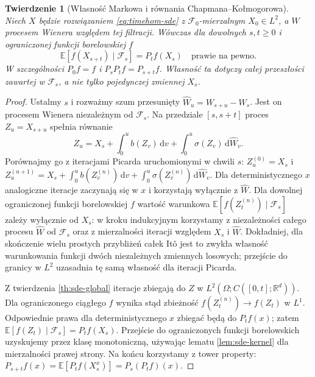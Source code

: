 \documentclass[11pt,a4paper,oneside]{report}
\numberwithin{equation}{chapter}
\theoremstyle{plain}
\newtheorem{twierdzenie}{Twierdzenie}[chapter]
\theoremstyle{definition}
\theoremstyle{remark}
\newcommand{\R}{\mathbb{R}}
\newcommand{\E}{\mathbb{E}}
\newcommand{\calF}{\mathcal{F}}
\newcommand{\dd}{\mathrm{d}}
\begin{document}
\begin{twierdzenie}[Własność Markowa i równania Chapmana--Kołmogorowa]
\label{th:sde-markov}
Niech $X$ będzie rozwiązaniem \eqref{eq:timehom-sde}
z $\calF_0$-mierzalnym $X_0\in L^2$, a $W$ procesem
Wienera względem tej filtracji. Wówczas dla dowolnych
$s,t\ge0$ i ograniczonej funkcji borelowskiej $f$
\[
\E[f(X_{s+t})\mid\calF_s]=P_tf(X_s)
\quad\text{prawie na pewno}.
\tag{6.3}\label{eq:sde-markov}
\]
W szczególności $P_0f=f$ i $P_sP_tf=P_{s+t}f$.
Własność ta dotyczy \emph{całej przeszłości} zawartej
w $\calF_s$, a nie tylko pojedynczej zmiennej $X_s$.
\end{twierdzenie}
\begin{proof}
Ustalmy $s$ i rozważmy szum przesunięty
$\widehat W_u=W_{s+u}-W_s$. Jest on procesem Wienera
niezależnym od $\calF_s$. Na przedziale $[s,s+t]$
proces $Z_u=X_{s+u}$ spełnia równanie
\[
Z_u=X_s+\int_0^u b(Z_v)\,\dd v
+\int_0^u\sigma(Z_v)\,\dd\widehat W_v.
\]
Porównajmy go z iteracjami Picarda uruchomionymi
w chwili $s$: $Z^{(0)}_u=X_s$ i
$Z^{(n+1)}_u=X_s+\int_0^u b(Z_v^{(n)})\,\dd v
+\int_0^u\sigma(Z_v^{(n)})\,\dd\widehat W_v$.
Dla deterministycznego $x$ analogiczne iteracje
zaczynają się w $x$ i korzystają wyłącznie z
$\widehat W$. Dla dowolnej ograniczonej funkcji
borelowskiej $f$ wartość warunkowa
$\E[f(Z_t^{(n)})\mid\calF_s]$ zależy wyłącznie od
$X_s$: w kroku indukcyjnym korzystamy z niezależności
całego procesu $\widehat W$ od $\calF_s$ oraz z
mierzalności iteracji względem $X_s$ i $\widehat W$.
Dokładniej, dla skończenie wielu prostych przybliżeń
całek Itô jest to zwykła własność warunkowania
funkcji dwóch niezależnych zmiennych losowych;
przejście do granicy w $L^2$ uzasadnia tę samą
własność dla iteracji Picarda.

Z twierdzenia \ref{th:sde-global} iteracje zbiegają do
$Z$ w $L^2(\Omega;C([0,t];\R^d))$.
Dla ograniczonego ciągłego $f$ wynika stąd
zbieżność $f(Z_t^{(n)})\to f(Z_t)$ w $L^1$.
Odpowiednie prawa dla deterministycznego $x$
zbiegać będą do $P_tf(x)$; zatem
$\E[f(Z_t)\mid\calF_s]=P_tf(X_s)$.
Przejście do ograniczonych funkcji borelowskich
uzyskujemy przez klasę monotoniczną, używając
lematu \ref{lem:sde-kernel} dla mierzalności
prawej strony. Na końcu korzystamy z tower property:
$P_{s+t}f(x)=\E[P_tf(X_s^x)]=P_s(P_tf)(x)$.
\end{proof}
\end{document}
